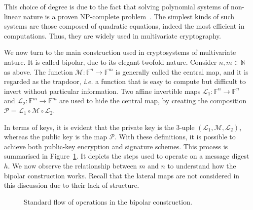 \documentclass[openright, draft, 10pt]{report}
\begin{document}
This choice of degree is due to the fact that solving polynomial systems of non-linear nature is a proven NP-complete problem~\cite[Theorem 10]{Fraenkel:197909:article}. The simplest kinds of such systems are those composed of quadratic equations, indeed the most efficient in computations. Thus, they are widely used in multivariate cryptography.

We now turn to the main construction used in cryptosystems of multivariate nature. It is called bipolar, due to its elegant twofold nature. Consider $n, m \in \mathbb{N}$ as above. The function $\mathcal{M}: \mathbb{F}^{n} \to \mathbb{F}^{m}$ is generally called the central map, and it is regarded as the trapdoor, \emph{i.e.} a function that is easy to compute but difficult to invert without particular information. Two affine invertible maps $\mathcal{L}_{1} : \mathbb{F}^{n} \to \mathbb{F}^{n}$ and $\mathcal{L}_{2} : \mathbb{F}^{m} \to \mathbb{F}^{m}$ are used to hide the central map, by creating the composition $\mathcal{P} = \mathcal{L}_{1} \circ \mathcal{M} \circ \mathcal{L}_{2}$.

In terms of keys, it is evident that the private key is the $3$-uple $(\mathcal{L}_{1}, \mathcal{M}, \mathcal{L}_{2})$, whereas the public key is the map $\mathcal{P}$. With these definitions, it is possible to achieve both public-key encryption and signature schemes. This process is summarised in Figure~\ref{fig:2}. It depicts the steps used to operate on a message digest $h$. We now observe the relationship between $m$ and $n$ to understand how the bipolar construction works. Recall that the lateral maps are not considered in this discussion due to their lack of structure.

\begin{figure}[htbp]
  \centering
  \caption{Standard flow of operations in the bipolar construction.}\label{fig:2}
\end{figure}
\end{document}
